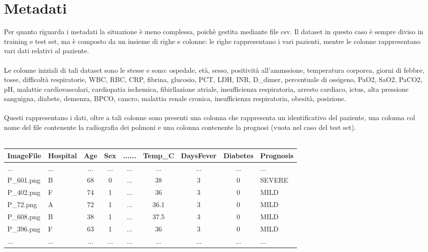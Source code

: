\section{Metadati}
Per quanto riguarda i metadati la situazione è meno complessa, poichè gestita mediante file csv.
Il dataset in questo caso è sempre diviso in training e test set, ma è composto da un insieme di righe e colonne:
le righe rappresentano i vari pazienti, mentre le colonne rappresentano vari dati relativi al paziente.
\\\\Le colonne iniziali di tali dataset sono le stesse e sono: 
    ospedale,
    età,
    sesso, 
    positività all'ammssione, 
    temperatura corporea,
    giorni di febbre, 
    tosse,
    difficoltà respiratorie,
    WBC,
    RBC,
    CRP,
    fibrina, 
    glucosio, 
    PCT, 
    LDH, 
    INR, 
    D\_dimer, 
    percentuale di ossigeno, 
    PaO2, 
    SaO2, 
    PaCO2, 
    pH, 
    malattie cardiovascolari,
    cardiopatia ischemica,
    fibirllazione atriale,
    insufficienza respiratoria,
    arresto cardiaco,
    ictus,
    alta pressione sanguigna,
    diabete,
    demenza,
    BPCO,
    cancro,
    malattia renale cronica,
    insufficienza respiratoria,
    obesità,
    posizione.
\\\\
Questi rappresentano i dati, oltre a tali colonne sono presenti una colonna che rappresenta un identificativo del paziente, una colonna col nome 
del file contenente la radiografia dei polmoni e una colonna contenente la prognosi (vuota nel caso del test set).
\\\\
\begin{tcolorbox}[tab2,tabularx={Y|Y|Y|Y|Y|Y|Y|Y|Y|Y},title=Estratto del dataset di training,width=1.25\textwidth, center=\textwidth]
    \centering
    \begin{tabular}{l|l|c|c|c|c|c|c|l}
        ImageFile & Hospital & Age & Sex & ...... & Temp\_C & DaysFever & Diabetes & Prognosis \\ \hline \hline
        ... & ... & ... & ... & ... & ... & ... & ... & ... \\
        P\_601.png & B & 68 & 0 &...& 38 & 3 & 0 & SEVERE \\
        
        P\_402.png & F & 74 & 1 &...& 36 & 3 & 0 & MILD \\
        
        P\_72.png & A & 72 & 1 &...& 36.1 & 3 & 0 & MILD  \\
        
        P\_608.png & B & 38 & 1 &...& 37.5 & 3 & 0 & MILD  \\
        
        P\_396.png & F & 63 & 1 &...& 36 & 3 & 0 & MILD \\
        ... & ... & ... & ... & ... & ... & ... & ... & ... 
    \end{tabular}     
\end{tcolorbox}
